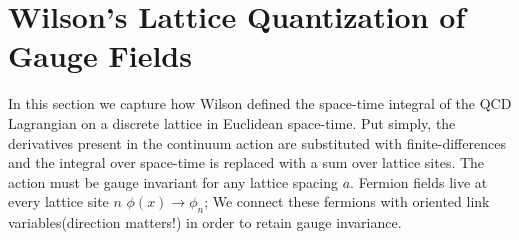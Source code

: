 \section{Wilson's Lattice Quantization of Gauge Fields }
In this section we capture how Wilson defined the space-time integral of the QCD Lagrangian on a discrete lattice in Euclidean space-time. Put simply, the derivatives present in the continuum action are substituted with finite-differences and the integral over space-time is replaced with a sum over lattice sites. The action must be gauge invariant for any lattice spacing $a$. Fermion fields live at every lattice site $n$ $\phi(x) \rightarrow \phi_n$; We connect these fermions with oriented link variables(direction matters!) in order to retain gauge invariance. 
\begin{center}
    \end{center}

\begin{center}
    \end{center}

